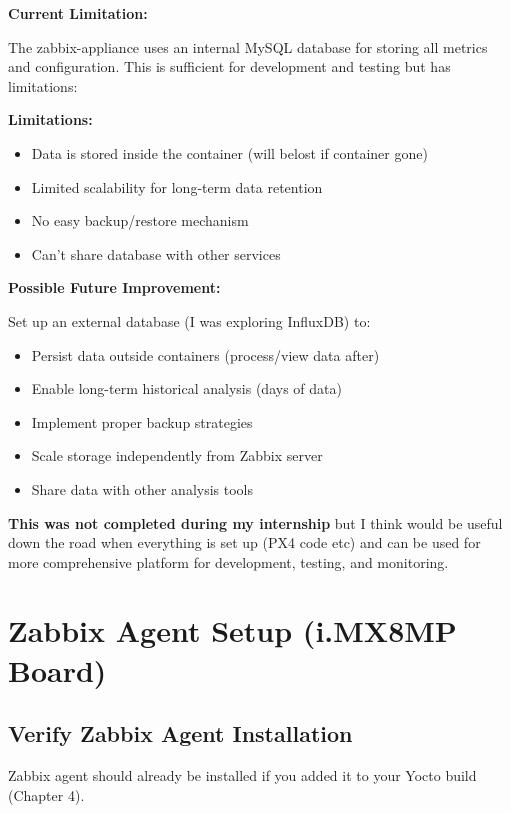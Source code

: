 \documentclass[12pt,a4paper]{report}
\begin{document}
\begin{important}
\textbf{Current Limitation:}

The zabbix-appliance uses an internal MySQL database for storing all metrics and configuration. This is sufficient for development and testing but has limitations:

\textbf{Limitations:}
\begin{itemize}
    \item Data is stored inside the container (will belost if container gone)
    \item Limited scalability for long-term data retention
    \item No easy backup/restore mechanism
    \item Can't share database with other services
\end{itemize}

\textbf{Possible Future Improvement:}

Set up an external database (I was exploring InfluxDB) to:
\begin{itemize}
    \item Persist data outside containers (process/view data after)
    \item Enable long-term historical analysis (days of data)
    \item Implement proper backup strategies
    \item Scale storage independently from Zabbix server
    \item Share data with other analysis tools
\end{itemize}

\textbf{This was not completed during my internship} but I think would be useful down the road when everything is set up (PX4 code etc) and can be used for more comprehensive platform for development, testing, and monitoring.
\end{important}

\section{Zabbix Agent Setup (i.MX8MP Board)}

\subsection{Verify Zabbix Agent Installation}

Zabbix agent should already be installed if you added it to your Yocto build (Chapter 4).
\end{document}
